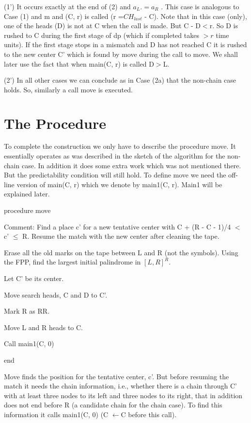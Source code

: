 \documentclass[11pt,a4paper]{report}
\begin{document}
(1’) It occurs exactly at the end of (2) and $a_L. = a_R$ . This case is analogous to
Case (1) and m and (C, r) is called (r =$CH_{last}$ - C). Note that in this case (only), one
of the heads (D) is not at C when the call is made. But C - D$<$r. So D is rushed to C
during the first stage of dp (which if completed takes $>r$ time units). If the first stage
stops in a mismatch and D has not reached C it is rushed to the new center C’ which is
found by move during the call to move. We shall later use the fact that when main(C, r)
is called D$>$L.

(2’) In all other cases we can conclude as in Case (2a) that the non-chain case holds.
So, similarly a call move is executed. 





\chapter{The Procedure}

To complete the construction we only have to describe the procedure move. It essentially
operates as was described in the sketch of the algorithm for the non-chain case. In addition
it does some extra work which was not mentioned there. But the predictability condition
will still hold. To define move we need the off-line version of main(C, r) which we denote
by main1(C, r). Main1 will be explained later.


procedure move
\begin{myindentpar}{4em}
Comment: Find a place c’ for a new tentative center with
C + (R - C - 1)/4 $<$ c’ $\leq$ R. Resume the match with the new center
after cleaning the tape.

Erase all the old marks on the tape between L and R (not the symbols).
Using the FPP, find the largest initial palindrome in $[L, R]^R$.

Let C’ be its center.

Move search heads, C and D to C’.

Mark R as RR.

Move L and R heads to C.

Call main1(C, 0)
\end{myindentpar}

end

Move finds the position for the tentative center, c’. But before resuming the match
it needs the chain information, i.e., whether there is a chain through C’ with at least three
nodes to its left and three nodes to its right, that in addition does not end before R
(a candidate chain for the chain case). To find this information it calls main1(C, 0) (C $\leftarrow$C
before this call).
\end{document}

